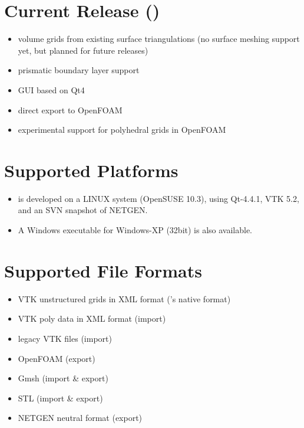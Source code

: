 \section{Current Release (\egv)}

\begin{itemize}
\item volume grids from existing surface triangulations (no surface meshing
support yet, but planned for future releases)
\item prismatic boundary layer support
\item GUI based on Qt4
\item direct export to OpenFOAM
\item experimental support for polyhedral grids in OpenFOAM
\end{itemize}

\section{Supported Platforms}

\begin{itemize}
\item \eg is developed on a LINUX system (OpenSUSE 10.3), using Qt-4.4.1,
VTK 5.2, and an SVN snapshot of NETGEN.
\item A Windows executable for Windows-XP (32bit) is also available.
\end{itemize}

\section{Supported File Formats}

\begin{itemize}
\item VTK unstructured grids in XML format (\eg's native format)
\item VTK poly data in XML format (import)
\item legacy VTK files (import)
\item OpenFOAM (export)
\item Gmsh (import \& export)
\item STL (import \& export)
\item NETGEN neutral format (export)
\end{itemize}


